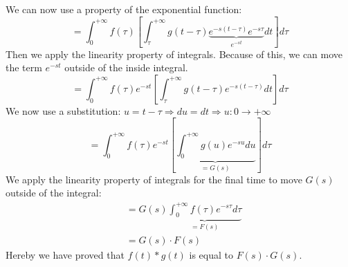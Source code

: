 \documentclass[]{subfiles}
\begin{document}
	We can now use a property of the exponential function:
	\begin{equation*}
		=\int_{0}^{+\infty}f(\tau)\left[ \int_{\tau}^{+\infty}g(t-\tau)\underbrace{e^{-s(t-\tau)}e^{-s\tau}}_{e^{-st}}dt\right]d\tau 
	\end{equation*}
	Then we apply the linearity property of integrals. Because of this, we can move the term $e^{-st}$ outside of the inside integral.
	\begin{equation*}
		=\int_{0}^{+\infty}f(\tau)e^{-st}\left[ \int_{\tau}^{+\infty}g(t-\tau)e^{-s(t-\tau)}dt\right] d\tau
	\end{equation*}%
	\newpage%
	We now use a substitution: $u = t-\tau  \Rightarrow du = dt \Rightarrow u: 0\rightarrow+\infty$
	\begin{equation*}
		=\int_{0}^{+\infty}f(\tau)e^{-st}\left[ \underbrace{\int_{0}^{+\infty}g(u)e^{-su}du}_{=G(s)}\right] d\tau
	\end{equation*}
	We apply the linearity property of integrals for the final time to move $G(s)$ outside of the integral:
	\begin{align*}
		&=G(s)\underbrace{\int_{0}^{+\infty}f(\tau)e^{-s\tau}d\tau}_{=F(s)}\\
		&=G(s)\cdot F(s)
	\end{align*}
	Hereby we have proved that $f(t)\ast g(t)$ is equal to $F(s)\cdot G(s)$.
\end{document}
